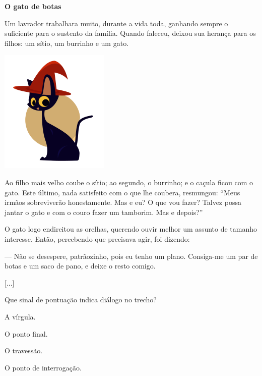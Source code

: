 \begin{myquote}
\textbf{O gato de botas}

Um lavrador trabalhara muito, durante a vida toda, ganhando sempre o
suficiente para o sustento da família. Quando faleceu, deixou sua
herança para os filhos: um sítio, um burrinho e um gato.

\begin{center}
\includegraphics[width=.5\textwidth]{./media/image7a.png}
\end{center}

Ao filho mais velho coube o sítio; ao segundo, o burrinho; e o caçula
ficou com o gato. Este último, nada satisfeito com o que lhe coubera,
resmungou: ``Meus irmãos sobreviverão honestamente. Mas e eu? O que vou
fazer? Talvez possa jantar o gato e com o couro fazer um tamborim. Mas e
depois?''

O gato logo endireitou as orelhas, querendo ouvir melhor um assunto de
tamanho interesse. Então, percebendo que precisava agir, foi dizendo:

--- Não se desespere, patrãozinho, pois eu tenho um plano. Consiga-me um
par de botas e um saco de pano, e deixe o resto comigo.

{[}...{]}

\end{myquote}

Que sinal de pontuação indica diálogo no trecho?

\begin{escolha}[itemsep=-5pt]
\item
  A vírgula.
\item
  O ponto final.
\item
  O travessão.
\item
  O ponto de interrogação.
\end{escolha}


